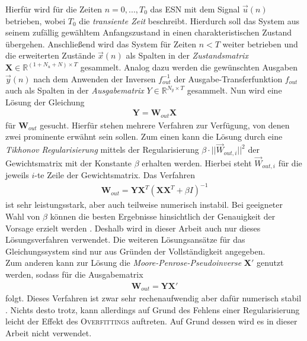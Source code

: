 Hierfür wird für die Zeiten $n=0, ..., T_0$ das \textsc{ESN} mit dem Signal $\vec{u}(n)$ betrieben, wobei $T_0$ die \textit{transiente Zeit} beschreibt. Hierdurch soll das System aus seinem zufällig gewähltem Anfangszustand in einen charakteristischen Zustand übergehen. Anschließend wird das System für Zeiten $n < T$ weiter betrieben und die erweiterten Zustände $\vec{x}(n)$ als Spalten in der \textit{Zustandsmatrix} $\mathbf{X} \in \mathbb{R}^{(1 + N_u + N) \times T}$ gesammelt. Analog dazu werden die gewünschten Ausgaben $\vec{y}(n)$ nach dem Anwenden der Inversen $f^{-1}_{out}$ der Ausgabe-Transferfunktion $f_{out}$ auch als Spalten in der \textit{Ausgabematrix} $Y \in \mathbb{R}^{N_y \times T}$ gesammelt.
Nun wird eine Lösung der Gleichung
\begin{align}
\mathbf{Y} = \mathbf{W}_{out} \mathbf{X}
\end{align}
für $\mathbf{W}_{out}$ gesucht. Hierfür stehen mehrere Verfahren zur Verfügung, von denen zwei prominente erwähnt sein sollen.
Zum einen kann die Lösung durch eine \textit{Tikhonov Regularisierung} mittels der Regularisierung $\beta \cdot ||\vec{W}_{out, i}||^2$ der Gewichtsmatrix mit der Konstante $\beta$ erhalten werden. Hierbei steht $\vec{W}_{out, i}$ für die jeweils $i$-te Zeile der Gewichtsmatrix. Das Verfahren
\begin{align}
\label{eq:tikhonov}
\mathbf{W}_{out} = \mathbf{Y} \mathbf{X}^T \left(\mathbf{X} \mathbf{X}^T + \beta I \right)^{-1}
\end{align}
ist sehr leistungsstark, aber auch teilweise numerisch instabil. Bei geeigneter Wahl von $\beta$ können die besten Ergebnisse hinsichtlich der Genauigkeit der Vorsage erzielt werden \cite{lukoseviciusa2009}. Deshalb wird in dieser Arbeit auch nur dieses Lösungsverfahren verwendet. Die weiteren Lösungsansätze für das Gleichungssystem sind nur aus Gründen der Vollständigkeit angegeben.\\

Zum anderen kann zur Lösung die \textit{Moore-Penrose-Pseudoinverse} $\mathbf{X}'$ genutzt werden, sodass für die Ausgabematrix
\begin{align}
\label{eq:pseudo_inverse}
\mathbf{W}_{out} = \mathbf{Y} \mathbf{X}'
\end{align}
folgt. Dieses Verfahren ist zwar sehr rechenaufwendig aber dafür numerisch stabil \cite{lukoseviciusa2009, jaeger2012}. Nichts desto trotz, kann allerdings auf Grund des Fehlens einer Regularisierung leicht der Effekt des \textsc{Overfittings} auftreten. Auf Grund dessen wird es in dieser Arbeit nicht verwendet.\\


